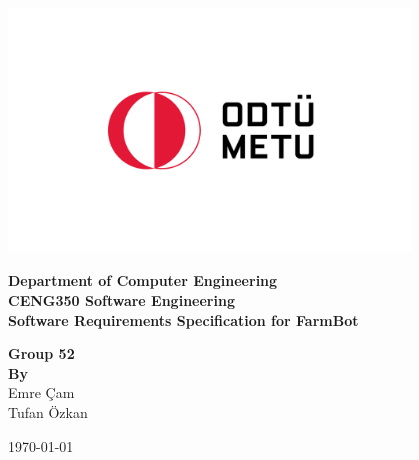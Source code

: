 \begin{titlepage}
   \begin{center}

       \includegraphics[width=0.8\textwidth]{Figures/metu_logo.png}
       \vspace{0.0cm}
     
            
        \textbf{\LARGE Department of  Computer Engineering} \\
        \vspace{0.5cm}
        \textbf{\LARGE CENG350 Software Engineering}\\
        \vspace{0.5cm} 
        \textbf{\LARGE Software Requirements Specification for FarmBot} \\
        \vspace{1.5cm} 
 

        \textbf{Group 52}\\
       \textbf{\textbf{By}} \\Emre Çam\\ Tufan Özkan 
       

       \vspace{1.5cm}
            
    
\vspace{0.5cm}
            


\today            
   \end{center}
\end{titlepage}